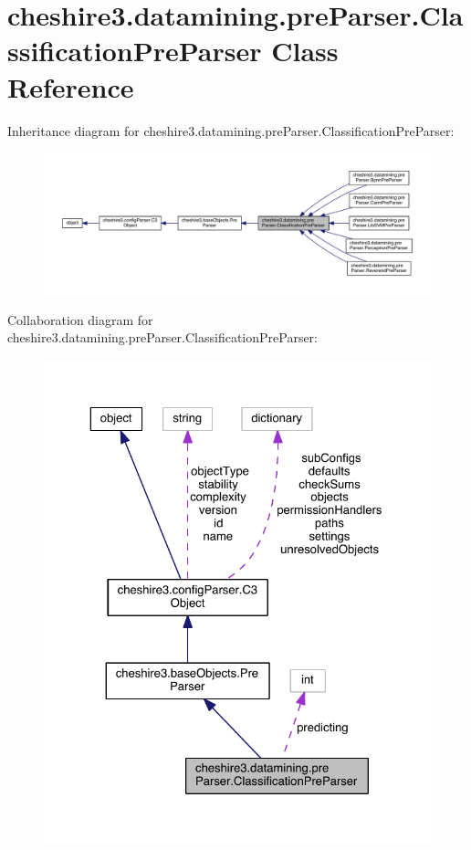 \hypertarget{classcheshire3_1_1datamining_1_1pre_parser_1_1_classification_pre_parser}{\section{cheshire3.\-datamining.\-pre\-Parser.\-Classification\-Pre\-Parser Class Reference}
\label{classcheshire3_1_1datamining_1_1pre_parser_1_1_classification_pre_parser}
}


Inheritance diagram for cheshire3.\-datamining.\-pre\-Parser.\-Classification\-Pre\-Parser\-:
\nopagebreak
\begin{figure}[H]
\begin{center}
\leavevmode
\includegraphics[width=350pt]{classcheshire3_1_1datamining_1_1pre_parser_1_1_classification_pre_parser__inherit__graph}
\end{center}
\end{figure}


Collaboration diagram for cheshire3.\-datamining.\-pre\-Parser.\-Classification\-Pre\-Parser\-:
\nopagebreak
\begin{figure}[H]
\begin{center}
\leavevmode
\includegraphics[width=325pt]{classcheshire3_1_1datamining_1_1pre_parser_1_1_classification_pre_parser__coll__graph}
\end{center}
\end{figure}
